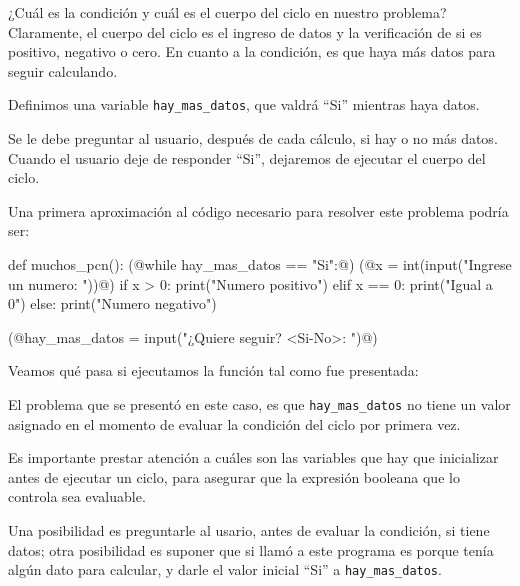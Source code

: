 ¿Cuál es la condición y cuál es el cuerpo del ciclo en nuestro problema?
Claramente, el cuerpo del ciclo es el ingreso de datos y la verificación de si
es positivo, negativo o cero.  En cuanto a la condición, es que haya más datos
para seguir calculando.

Definimos una variable \lstinline!hay_mas_datos!, que valdrá ``Si'' mientras
haya datos.

Se le debe preguntar al usuario, después de cada cálculo, si hay o no más datos.
Cuando el usuario deje de responder ``Si'', dejaremos de ejecutar el cuerpo del
ciclo.

Una primera aproximación al código necesario para resolver este problema podría
ser:

\begin{codigo-python-sn}
def muchos_pcn():
    (@while hay_mas_datos == "Si":@)
        (@x = int(input("Ingrese un numero: "))@)
        if x > 0:
            print("Numero positivo")
        elif x == 0:
            print("Igual a 0")
        else:
            print("Numero negativo")

        (@hay_mas_datos = input("¿Quiere seguir? <Si-No>: ")@)
\end{codigo-python-sn}

Veamos qué pasa si ejecutamos la función tal como fue presentada:


El problema que se presentó en este caso, es que \lstinline!hay_mas_datos! no
tiene un valor asignado en el momento de evaluar la condición del ciclo por
primera vez.

\begin{observacion}
Es importante prestar atención a cuáles son las variables que hay que
inicializar antes de ejecutar un ciclo, para asegurar que la expresión
booleana que lo controla sea evaluable.
\end{observacion}

Una posibilidad es preguntarle al usario, antes de evaluar la condición, si
tiene datos; otra posibilidad es suponer que si llamó a este programa es porque
tenía algún dato para calcular, y darle el valor inicial ``Si'' a
\lstinline!hay_mas_datos!.

